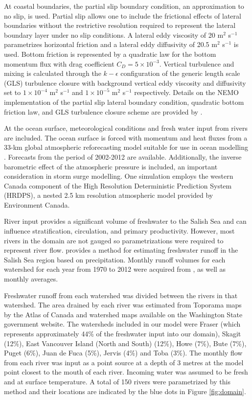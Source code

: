 \documentclass[pdftex,10pt]{article}
\begin{document}
At coastal boundaries, the partial slip boundary condition, an approximation to no slip, is used. Partial slip allows one to include the frictional effects of lateral boundaries without the restrictive resolution required to represent the lateral boundary layer under no slip conditions. A lateral eddy viscosity of 20 m$^2$ s$^{-1}$ parametrizes horizontal friction and a lateral eddy diffusivity of 20.5 m$^2$ s$^{-1}$ is used.  Bottom friction is represented by a quadratic law for the bottom momentum flux with drag coefficient $C_D = 5\times 10^{-3}$. Vertical turbulence and mixing is calculated through the $k-\epsilon$ configuration of the generic length scale (GLS) turbulence closure \citep{umlauf2003generic} with background vertical eddy viscosity and diffusivity set to $1\times10^{-4}$ m$^2$ s$^{-1}$ and $1\times10^{-5}$ m$^2$ s$^{-1}$ respectively. Details on the NEMO implementation of the partial slip lateral boundary condition, quadratic bottom friction law, and GLS turbulence closure scheme are provided by \citet{madec2012nemo}.

At the ocean surface, meteorological conditions and fresh water input from rivers are included. The ocean surface is forced with momentum and heat fluxes from a 33-km global atmospheric reforecasting model suitable for use in ocean modelling \citep{smith2014new}. Forecasts from the period of 2002-2012 are available. Additionally, the inverse barometric effect of the atmospheric pressure is included, an important consideration in storm surge modelling. One simulation employs the western Canada component of the High Resolution Deterministic Prediction System (HRDPS), a nested 2.5 km resolution atmospheric model provided by Environment Canada. %

River input provides a significant volume of freshwater to the Salish Sea and can influence stratification, circulation, and primary productivity. However, most rivers in the domain are not gauged so parametrizations were required to represent river flow. \citet{morrison2011rivers} provides a method for estimating freshwater runoff in the Salish Sea region based on precipitation. Monthly runoff volumes for each watershed for each year from 1970 to 2012 were acquired from \citet{morrison2011rivers}, as well as monthly averages. 

Freshwater runoff from each watershed was divided between the rivers in that watershed. The area drained by each river was estimated from Toporama maps by the Atlas of Canada and watershed maps available on the Washington State government website. The watersheds included in our model were Fraser (which represents approximately 44\% of the freshwater input into our domain), Skagit (12\%), East Vancouver Island (North and South) (12\%), Howe (7\%), Bute (7\%), Puget (6\%), Juan de Fuca (5\%), Jervis (4\%) and Toba (3\%). The monthly flow from each river was input as a point source at a depth of 3 metres at the model point closest to the mouth of each river. Incoming water was assumed to be fresh and at surface temperature. A total of 150 rivers were parametrized by this method and their locations are indicated by the blue dots in Figure \ref{fig:domain}.
\end{document}
